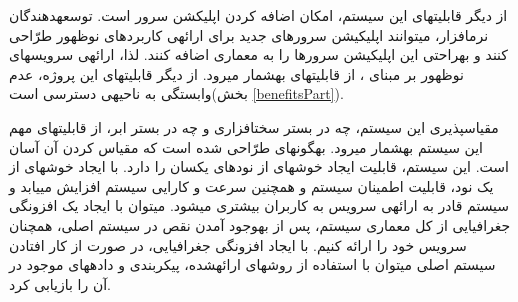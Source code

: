 از دیگر قابلیت\nf های این سیستم، امکان اضافه کردن اپلیکشن سرور است. توسعه\nf دهندگان نرم\nf افزار، می\nf توانند اپلیکیشن سرورهای جدید برای ارائه\nf ی کاربردهای نوظهور طرّاحی کنند و به\nf راحتی این اپلیکیشن سرورها را به معماری  اضافه کنند. لذا، ارائه\nf ی سرویس\nf های نوظهور بر مبنای ، از قابلیت\nf های  به\nf شمار می\nf رود. از دیگر قابلیت\nf های این پروژه، عدم وابستگی به ناحیه\nf ی دسترسی است(بخش \ref{benefitsPart}). 

مقیاس\nf پذیری این سیستم، چه در بستر سخت\nf افزاری و چه در بستر ابر، از قابلیت\nf های مهم این سیستم به\nf شمار می\nf رود.  به\nf گونه\nf ای طرّاحی شده است که مقیاس کردن آن آسان است. این سیستم، قابلیت ایجاد خوشه\nf ای از نودهای یکسان را دارد. با ایجاد خوشه\nf ای از یک نود، قابلیت اطمینان سیستم و همچنین سرعت و کارایی سیستم افزایش می\nf یابد و سیستم قادر به ارائه\nf ی سرویس به کاربران بیشتری می\nf شود. می\nf توان با ایجاد یک افزونگی جغرافیایی از کل معماری سیستم، پس از به\nf وجود آمدن نقص در سیستم اصلی، همچنان سرویس خود را ارائه کنیم. با ایجاد افزونگی جغرافیایی، در صورت از کار افتادن سیستم اصلی می\nf توان با استفاده از روش\nf های ارائه\nf شده، پیکربندی و داده\nf های موجود در آن را بازیابی کرد.

  

